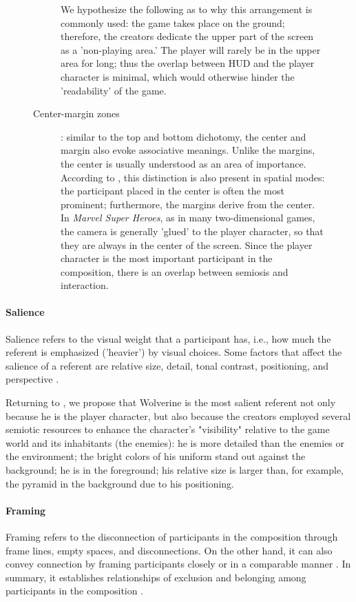 \documentclass[english]{textolivre}
\begin{document}
\begin{figure}[htbp]
\begin{minipage}[t]{\textwidth}
\begin{description}
    We hypothesize the following as to why this arrangement is commonly used: the game takes place on the ground; therefore, the creators dedicate the upper part of the screen as a 'non-playing area.' The player will rarely be in the upper area for long; thus the overlap between HUD and the player character is minimal, which would otherwise hinder the 'readability' of the game.

    \item[Center-margin zones]: similar to the top and bottom dichotomy, the center and margin also evoke associative meanings. Unlike the margins, the center is usually understood as an area of importance. According to \textcite[p. 198]{kress_reading_2020}, this distinction is also present in spatial modes: the participant placed in the center is often the most prominent; furthermore, the margins derive from the center. In \textit{Marvel Super Heroes}, as in many two-dimensional games, the camera is generally 'glued' to the player character, so that they are always in the center of the screen. Since the player character is the most important participant in the composition, there is an overlap between semiosis and interaction.
\end{description}
\end{minipage}
\end{figure}

\paragraph{Salience}\label{sec-format-simple}
Salience refers to the visual weight that a participant has, i.e., how much the referent is emphasized ('heavier') by visual choices. Some factors that affect the salience of a referent are relative size, detail, tonal contrast, positioning, and perspective \cites[p. 198]{van_leeuwen_introducing_2005}[p. 182]{kress_reading_2020}.

Returning to , we propose that Wolverine is the most salient referent not only because he is the player character, but also because the creators employed several semiotic resources to enhance the character's "visibility" relative to the game world and its inhabitants (the enemies): he is more detailed than the enemies or the environment; the bright colors of his uniform stand out against the background; he is in the foreground; his relative size is larger than, for example, the pyramid in the background due to his positioning.

\paragraph{Framing}\label{sec-format-simple}
Framing refers to the disconnection of participants in the composition through frame lines, empty spaces, and disconnections. On the other hand, it can also convey connection by framing participants closely or in a comparable manner \cite[p.~277]{van_leeuwen_introducing_2005}. In summary, it establishes relationships of exclusion and belonging among participants in the composition \cite[p. 181-2]{kress_reading_2020}.
\end{document}
